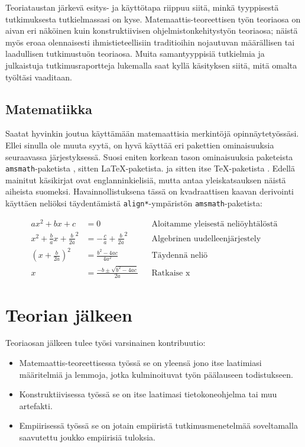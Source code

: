 \documentclass[utf8,bachelor]{gradu3}
\begin{document}
Teoriataustan järkevä esitys- ja käyttötapa riippuu siitä, minkä
tyyppisestä tutkimuksesta tutkielmassasi on kyse.
Matemaattis-teoreettisen työn teoriaosa on aivan eri näköinen kuin
konstruktiivisen ohjelmistonkehitystyön teoriaosa; näistä myös eroaa
olennaisesti ihmistieteellisiin traditioihin nojautuvan määrällisen
tai laadullisen tutkimustuön teoriaosa.  Muita samantyyppisiä
tutkielmia ja julkaistuja tutkimusraportteja lukemalla saat kyllä
käsityksen siitä, mitä omalta työltäsi vaaditaan.

\subsection{Matematiikka}

Saatat hyvinkin joutua käyttämään matemaattisia merkintöjä opinnäytetyössäsi.
Ellei sinulla ole muuta syytä, on hyvä käyttää eri pakettien
ominaisuuksia seuraavassa järjestyksessä. Suosi eniten korkean tason
ominaisuuksia paketeista \texttt{amsmath}-paketista
\parencite[katso][]{amsmath-manual}, sitten \LaTeX-paketista.
\parencite[katso][]{lamport94:_latex} ja sitten itse \TeX-paketista
\parencite[katso][]{knuth86:_texbook}. Edellä mainitut käsikirjat ovat
englanninkielisiä, mutta  antaa
yleiskatsauksen näistä aiheista suomeksi. Havainnollistuksena tässä on
kvadraattisen kaavan derivointi käyttäen neliöksi täydentämistä
\texttt{align*}-ympäristön \texttt{amsmath}-paketista:

\begin{align*}
  ax^2 + bx + c &= 0 && \text{Aloitamme yleisestä neliöyhtälöstä} \\
  x^2 + \frac{b}{a}x + \frac{b}{2a}^2 &= -\frac{c}{a} + \frac{b}{2a}^2 && \text{Algebrinen uudelleenjärjestely} \\
  \left(x + \frac{b}{2a}\right)^2 &= \frac{b^2 - 4ac}{4a^2} && \text{Täydennä neliö} \\
  x &= \frac{-b \pm \sqrt{b^2 - 4ac}}{2a} && \text{Ratkaise x}
\end{align*}

\section{Teorian jälkeen}

Teoriaosan jälkeen tulee työsi varsinainen kontribuutio:
\begin{itemize}
\item Matemaattis-teoreettisessa työssä se on yleensä jono itse
  laatimiasi määritelmiä ja lemmoja, jotka kulminoituvat työn
  päälauseen todistukseen.
\item Konstruktiivisessa työssä se on itse laatimasi tietokoneohjelma
  tai muu artefakti.
\item Empiirisessä työssä se on jotain empiiristä tutkimusmenetelmää
  soveltamalla saavutettu joukko empiirisiä tuloksia.
\end{itemize}
\end{document}
